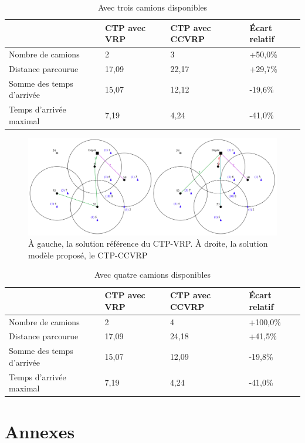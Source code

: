 \documentclass[12pt, a4paper, onecolumn, twoside,french,cleardoublepage=plain,openany]{article}
\begin{document}
\begin{table}[H] \centering \begin{tabular}{@{}llll@{}} \toprule %
 & CTP avec VRP & CTP avec CCVRP & Écart relatif \\ \midrule
Nombre de camions & 2 & 3 & +50,0\% \\
Distance parcourue & 17,09 & 22,17 & +29,7\% \\
Somme des temps d'arrivée & 15,07 & 12,12 & -19,6\% \\
Temps d'arrivée maximal & 7,19 & 4,24 & -41,0\% \\ \bottomrule
\end{tabular} \caption{Avec trois camions disponibles} \label{trois_camions}
\end{table}


\begin{figure}[H] \centering
	\centerline{\includegraphics[width=1.3\textwidth]{figures/quatre_camions_combines}}
	\caption[]{À gauche, la solution référence du CTP-VRP. À droite, la solution modèle proposé, le CTP-CCVRP} \label{fig_trois_camions}
\end{figure}

\begin{table}[H] \centering \begin{tabular}{@{}llll@{}} \toprule %
 & CTP avec VRP & CTP avec CCVRP & Écart relatif \\ \midrule
Nombre de camions & 2 & 4 & +100,0\% \\
Distance parcourue & 17,09 & 24,18 & +41,5\% \\
Somme des temps d'arrivée & 15,07 & 12,09 & -19,8\% \\
Temps d'arrivée maximal & 7,19 & 4,24 & -41,0\% \\ \bottomrule
\end{tabular} \caption{Avec quatre camions disponibles} \label{quatre_camions}
\end{table}

\section*{Annexes}
\end{document}
